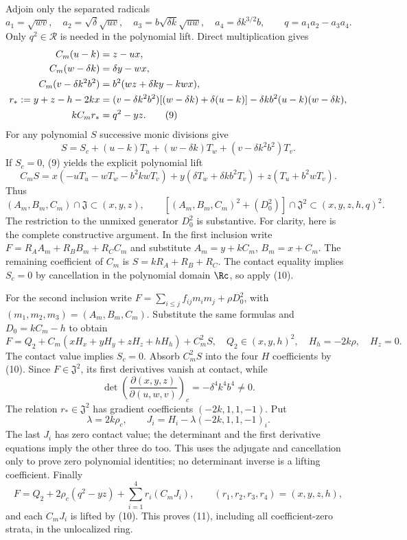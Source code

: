 Adjoin only the separated radicals
\[
 a_1=\sqrt{wv},\quad a_2=\sqrt\delta\sqrt{uv},\quad
 a_3=b\sqrt{\delta k}\sqrt{uw},\quad
 a_4=\delta k^{3/2}b,\qquad q=a_1a_2-a_3a_4.
\]
Only $q^2\in\mathcal R$ is needed in the polynomial lift. Direct
multiplication gives
\begin{align}
 C_m(u-k)&=z-ux,\notag\\
 C_m(w-\delta k)&=\delta y-wx,\notag\\
 C_m(v-\delta k^2b^2)&=b^2(wz+\delta ky-kwx),\notag\\
 r_*:=y+z-h-2kx
 &=(v-\delta k^2b^2)[(w-\delta k)+\delta(u-k)]
       -\delta kb^2(u-k)(w-\delta k),\notag\\
 kC_mr_*&=q^2-yz.                                      \tag{9}
\end{align}
For any polynomial $S$ successive monic divisions give
\[
 S=S_c+(u-k)T_u+(w-\delta k)T_w
              +(v-\delta k^2b^2)T_v.
\]
If $S_c=0$, (9) yields the explicit polynomial lift
\begin{equation}
 C_mS=x(-uT_u-wT_w-b^2kwT_v)
      +y(\delta T_w+\delta kb^2T_v)+z(T_u+b^2wT_v).      \tag{10}
\end{equation}
Thus
\begin{equation}
 (A_m,B_m,C_m)\cap\mathfrak J\subset(x,y,z),\qquad
 [(A_m,B_m,C_m)^2+(D_0^2)]\cap\mathfrak J^2
                      \subset(x,y,z,h,q)^2.            \tag{11}
\end{equation}
The restriction to the unmixed generator $D_0^2$ is substantive.
For clarity, here is the complete constructive argument. In the first
inclusion write $F=R_AA_m+R_BB_m+R_CC_m$ and substitute
$A_m=y+kC_m$, $B_m=x+C_m$. The remaining coefficient of $C_m$ is
$S=kR_A+R_B+R_C$. The contact equality implies $S_c=0$ by cancellation
in the polynomial domain $\Rc$, so apply (10).

For the second inclusion write
$F=\sum_{i\le j}f_{ij}m_im_j+\rho D_0^2$, with
$(m_1,m_2,m_3)=(A_m,B_m,C_m)$. Substitute the same formulas and
$D_0=kC_m-h$ to obtain
\[
 F=Q_2+C_m(xH_x+yH_y+zH_z+hH_h)+C_m^2S,
 \quad Q_2\in(x,y,h)^2,\quad H_h=-2k\rho,\quad H_z=0.
\]
The contact value implies $S_c=0$. Absorb $C_m^2S$ into the four
$H$ coefficients by (10). Since $F\in\mathfrak J^2$, its first
derivatives vanish at contact, while
\[
 \det\left(\frac{\partial(x,y,z)}{\partial(u,w,v)}\right)_c
        =-\delta^4k^4b^4\ne0.
\]
The relation $r_*\in\mathfrak J^2$ has gradient coefficients
$(-2k,1,1,-1)$. Put
\[
 \lambda=2k\rho_c,\qquad J_i=H_i-\lambda(-2k,1,1,-1)_i.
\]
The last $J_i$ has zero contact
value; the determinant and the first derivative equations imply the
other three do too. This uses the adjugate and cancellation only to
prove zero polynomial identities; no determinant inverse is a lifting
coefficient. Finally
\[
 F=Q_2+2\rho_c(q^2-yz)+\sum_{i=1}^4r_i(C_mJ_i),
 \qquad(r_1,r_2,r_3,r_4)=(x,y,z,h),
\]
and each $C_mJ_i$ is lifted by (10). This proves (11), including all
coefficient-zero strata, in the unlocalized ring.


